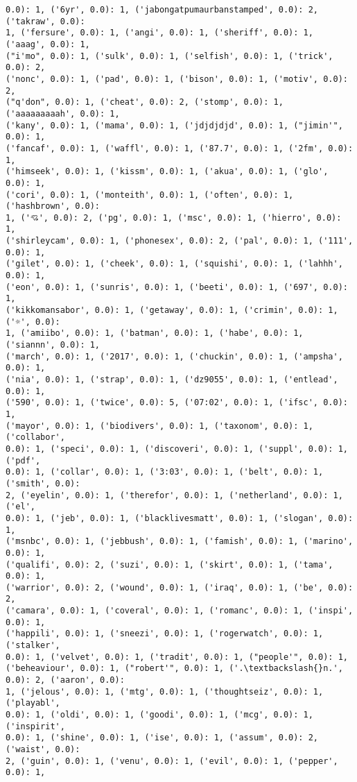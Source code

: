 \documentclass[11pt]{article}
\begin{document}
\begin{Verbatim}[commandchars=\\\{\}]
0.0): 1, ('6yr', 0.0): 1, ('jabongatpumaurbanstamped', 0.0): 2, ('takraw', 0.0):
1, ('fersure', 0.0): 1, ('angi', 0.0): 1, ('sheriff', 0.0): 1, ('aaag', 0.0): 1,
("i'mo", 0.0): 1, ('sulk', 0.0): 1, ('selfish', 0.0): 1, ('trick', 0.0): 2,
('nonc', 0.0): 1, ('pad', 0.0): 1, ('bison', 0.0): 1, ('motiv', 0.0): 2,
("q'don", 0.0): 1, ('cheat', 0.0): 2, ('stomp', 0.0): 1, ('aaaaaaaaah', 0.0): 1,
('kany', 0.0): 1, ('mama', 0.0): 1, ('jdjdjdjd', 0.0): 1, ("jimin'", 0.0): 1,
('fancaf', 0.0): 1, ('waffl', 0.0): 1, ('87.7', 0.0): 1, ('2fm', 0.0): 1,
('himseek', 0.0): 1, ('kissm', 0.0): 1, ('akua', 0.0): 1, ('glo', 0.0): 1,
('cori', 0.0): 1, ('monteith', 0.0): 1, ('often', 0.0): 1, ('hashbrown', 0.0):
1, ('💘', 0.0): 2, ('pg', 0.0): 1, ('msc', 0.0): 1, ('hierro', 0.0): 1,
('shirleycam', 0.0): 1, ('phonesex', 0.0): 2, ('pal', 0.0): 1, ('111', 0.0): 1,
('gilet', 0.0): 1, ('cheek', 0.0): 1, ('squishi', 0.0): 1, ('lahhh', 0.0): 1,
('eon', 0.0): 1, ('sunris', 0.0): 1, ('beeti', 0.0): 1, ('697', 0.0): 1,
('kikkomansabor', 0.0): 1, ('getaway', 0.0): 1, ('crimin', 0.0): 1, ('☼', 0.0):
1, ('amiibo', 0.0): 1, ('batman', 0.0): 1, ('habe', 0.0): 1, ('siannn', 0.0): 1,
('march', 0.0): 1, ('2017', 0.0): 1, ('chuckin', 0.0): 1, ('ampsha', 0.0): 1,
('nia', 0.0): 1, ('strap', 0.0): 1, ('dz9055', 0.0): 1, ('entlead', 0.0): 1,
('590', 0.0): 1, ('twice', 0.0): 5, ('07:02', 0.0): 1, ('ifsc', 0.0): 1,
('mayor', 0.0): 1, ('biodivers', 0.0): 1, ('taxonom', 0.0): 1, ('collabor',
0.0): 1, ('speci', 0.0): 1, ('discoveri', 0.0): 1, ('suppl', 0.0): 1, ('pdf',
0.0): 1, ('collar', 0.0): 1, ('3:03', 0.0): 1, ('belt', 0.0): 1, ('smith', 0.0):
2, ('eyelin', 0.0): 1, ('therefor', 0.0): 1, ('netherland', 0.0): 1, ('el',
0.0): 1, ('jeb', 0.0): 1, ('blacklivesmatt', 0.0): 1, ('slogan', 0.0): 1,
('msnbc', 0.0): 1, ('jebbush', 0.0): 1, ('famish', 0.0): 1, ('marino', 0.0): 1,
('qualifi', 0.0): 2, ('suzi', 0.0): 1, ('skirt', 0.0): 1, ('tama', 0.0): 1,
('warrior', 0.0): 2, ('wound', 0.0): 1, ('iraq', 0.0): 1, ('be', 0.0): 2,
('camara', 0.0): 1, ('coveral', 0.0): 1, ('romanc', 0.0): 1, ('inspi', 0.0): 1,
('happili', 0.0): 1, ('sneezi', 0.0): 1, ('rogerwatch', 0.0): 1, ('stalker',
0.0): 1, ('velvet', 0.0): 1, ('tradit', 0.0): 1, ("people'", 0.0): 1,
('beheaviour', 0.0): 1, ("robert'", 0.0): 1, ('.\textbackslash{}n.', 0.0): 2, ('aaron', 0.0):
1, ('jelous', 0.0): 1, ('mtg', 0.0): 1, ('thoughtseiz', 0.0): 1, ('playabl',
0.0): 1, ('oldi', 0.0): 1, ('goodi', 0.0): 1, ('mcg', 0.0): 1, ('inspirit',
0.0): 1, ('shine', 0.0): 1, ('ise', 0.0): 1, ('assum', 0.0): 2, ('waist', 0.0):
2, ('guin', 0.0): 1, ('venu', 0.0): 1, ('evil', 0.0): 1, ('pepper', 0.0): 1,

\end{Verbatim}
\end{document}
